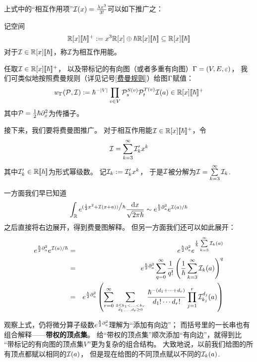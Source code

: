 上式中的“相互作用项”$\mathcal{I}(x)=\frac{\lambda x^3}{3!}$可以如下推广之：

\begin{notation}记空间
$$\mathbb{R}[x][\![\hbar]\!]^+:=
x^3\mathbb{R}[x]\oplus\hbar\mathbb{R}[x][\![\hbar]\!]
\subseteq\mathbb{R}[x][\![\hbar]\!]$$
对于$\mathcal{I}\in\mathbb{R}[x][\![\hbar]\!]$，称$\mathcal{I}$为相互作用能。
\end{notation}
任取$\mathcal{I}\in\mathbb{R}[x][\![\hbar]\!]^+$，
以及带标记的有向图（或者多重有向图）$\Gamma=(V,E,\varepsilon)$，
我们可类似地按照费曼规则（详见记号\ref{费曼规则}）给图$\Gamma$赋值：
$$w_\Gamma(\mathcal{P},\mathcal{I}):=
     \hbar^{-|V|}
     \prod_{v\in V}
       \mathcal{P}_s^{S(v)}
       \mathcal{P}_t^{T(v)}
       \mathcal{I}(a)
\in
     \mathbb{R}[x][\![\hbar]\!]^+
$$
其中$\mathcal{P}=\frac{1}{2}\hbar\partial^2_x$为传播子。

接下来，我们要将费曼图推广。
对于相互作用能$\mathcal{I}\in\mathbb{R}[x][\![\hbar]\!]^+$，令
$$\mathcal{I}=\sum_{k=3}^\infty\mathcal{I}_{k}'x^k$$
其中$\mathcal{I}_{k}'\in\mathbb{R}[\![\hbar]\!]$为形式幂级数。
记$\mathcal{I}_k:=\mathcal{I}_{k}'x^k$，
于是$\mathcal{I}$被分解为$\mathcal{I}=\sum\limits_{k=3}^\infty\mathcal{I}_k$.

一方面我们早已知道
$$
     \int_{\mathbb{R}}
       e^{(\frac{1}{2}x^2+\mathcal{I}(x+a))\big/\hbar}
       \frac{\mathrm{d} x}{\sqrt{2\pi\hbar}}
\sim
     e^{\frac{\hbar}{2}\partial_a^2}
     e^{\mathcal{I}(a)/\hbar}
$$
之后直接将右边展开，得到费曼图解释。
但另一方面我们还可以如此展开：
\begin{eqnarray*}
     e^{\frac{\hbar}{2}\partial_a^2}
     e^{\mathcal{I}(a)/\hbar}
&=&
     e^{\frac{\hbar}{2}\partial_a^2}
     e^{\frac{1}{\hbar}
        \sum\limits_{k=3}^\infty
          \mathcal{I}_{k}(a)
       }\\
&=&
     e^{\frac{\hbar}{2}\partial_a^2}
     \sum_{q=0}^{\infty}
       \frac{1}{q!}
       \left(
         \frac{1}{\hbar}
         \sum_{k=3}^\infty
           \mathcal{I}_{k}(a)
       \right)^q\\
&=&
     e^{\frac{\hbar}{2}\partial_a^2}
     \left(
       \sum_{r=0}^\infty
         \sum_{
               3\leq k_1<...<k_r
               \atop
               d_1,...,d_r\geq 0
              }
           \frac{\hbar^{-(d_1+\cdots+d_r)}}
                {d_1!\cdots d_r!}
           \prod_{j=1}^r
             \mathcal{I}_{k_j}^{d_j}(a)
     \right)
\end{eqnarray*}

观察上式，仍将微分算子级数$e^{\frac{\hbar}{2}\partial_a^2}$理解为“添加有向边”；
而括号里的一长串也有组合解释——\textbf{带权的顶点集}。
给“带权的顶点集”顺次添加“有向边”，就得到比
“带标记的有向图的顶点集$V$”更为复杂的组合结构。
大致地说，以前我们给图的所有顶点都赋以相同的$\mathcal{I}(a)$，
但是现在给图的不同顶点赋以不同的$\mathcal{I}_{k}(a)$.

